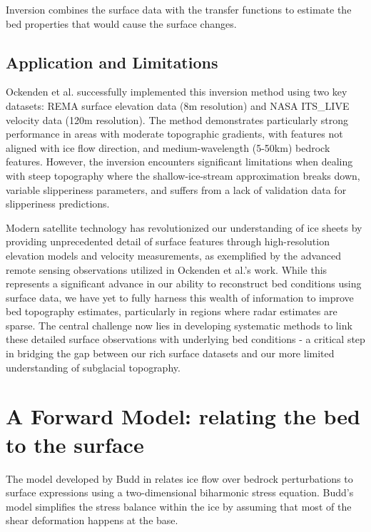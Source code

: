 Inversion combines the surface data with the transfer functions to estimate the bed properties that would cause the surface changes.

\subsection*{Application and Limitations}

Ockenden et al. successfully implemented this inversion method using two key datasets: REMA surface elevation data (8m resolution) and NASA ITS\_LIVE velocity data (120m resolution). The method demonstrates particularly strong performance in areas with moderate topographic gradients, with features not aligned with ice flow direction, and medium-wavelength (5-50km) bedrock features. However, the inversion encounters significant limitations when dealing with steep topography where the shallow-ice-stream approximation breaks down, variable slipperiness parameters, and suffers from a lack of validation data for slipperiness predictions.

Modern satellite technology has revolutionized our understanding of ice sheets by providing unprecedented detail of surface features through high-resolution elevation models and velocity measurements, as exemplified by the advanced remote sensing observations utilized in Ockenden et al.'s work. While this represents a significant advance in our ability to reconstruct bed conditions using surface data, we have yet to fully harness this wealth of information to improve bed topography estimates, particularly in regions where radar estimates are sparse. The central challenge now lies in developing systematic methods to link these detailed surface observations with underlying bed conditions - a critical step in bridging the gap between our rich surface datasets and our more limited understanding of subglacial topography.

\section*{A Forward Model: relating the bed to the surface}

The model developed by Budd in \cite{Budd_1970} relates ice flow over bedrock perturbations to surface expressions using a two-dimensional biharmonic stress equation. Budd's model simplifies the stress balance within the ice by assuming that most of the shear deformation happens at the base. 


